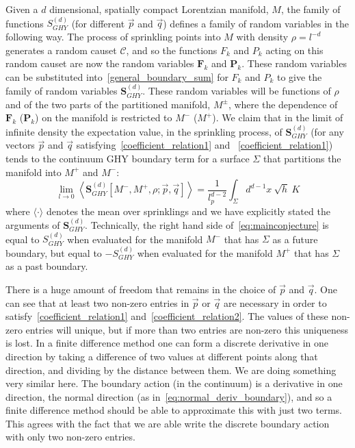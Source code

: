 \documentclass[12pt]{article}
\newcommand{\be}{\begin{equation}}
\newcommand{\ee}{\end{equation}}
\newcommand{\F}[1]{F_{#1}}
\renewcommand{\P}[1]{P_{#1}}
\newcommand{\BF}[1]{\mathbf{F}_{#1}}
\newcommand{\BP}[1]{\mathbf{P}_{#1}}
\begin{document}
Given a $d$ dimensional, spatially compact Lorentzian manifold, $M$, the family of functions $S^{ (d)}_{GHY}$ (for different $\vec{p}$ and $\vec{q}$) defines a family of random variables in the following way. The process of sprinkling points into $M$ with density $\rho=l^{-d}$ generates a random causet $\mathcal{C}$, and so the functions $\F{k}$ and $\P{k}$ acting on this random causet are now the random variables $\BF{k}$ and $\BP{k}$. These random variables can be substituted into~\eqref{general_boundary_sum} for $\F{k}$ and $\P{k}$ to give the family of random variables $\textbf{S}^{ (d)}_{GHY}$. These random variables will be functions of $\rho$ and of the two parts of the partitioned manifold, $M^{\pm}$, where the dependence of $\BF{k}$ ($\BP{k}$) on the manifold is restricted to $M^-$ ($M^+$). We claim that in the limit of infinite density the expectation value, in the sprinkling process, of $\textbf{S}^{ (d)}_{GHY}$ (for any vectors $\vec{p}$ and $\vec{q}$ satisfying~\eqref{coefficient_relation1} and ~\eqref{coefficient_relation1}) tends to the continuum GHY boundary term for a surface $\Sigma$ that partitions the manifold into $M^+$ and $M^-$:
\be
\lim_{l\rightarrow0}\left\langle\textbf{S}^{ (d)}_{GHY}[M^-,M^+,\rho;\vec{p} , \vec{q}]\right\rangle= \frac{1}{l_p^{d-2}}\int_{\Sigma} d^{d-1}x\: \sqrt{h}\: K\label{eq:mainconjecture}
\ee
where $\langle\cdot\rangle$ denotes the mean over sprinklings and we have explicitly stated the arguments of $\textbf{S}^{ (d)}_{GHY}$. Technically, the right hand side of~\eqref{eq:mainconjecture} is equal to ${S}^{(d)}_{GHY}$ when evaluated for the manifold $M^-$ that has $\Sigma$ as a future boundary, but equal to  $-{S}^{(d)}_{GHY}$ when evaluated for the manifold $M^+$ that has $\Sigma$ as a past boundary.

There is a huge amount of freedom that remains in the choice of $\vec{p}$ and $\vec{q}$. One can see that at least two non-zero entries in $\vec{p}$ or $\vec{q}$ are necessary in order to satisfy~\eqref{coefficient_relation1} and~\eqref{coefficient_relation2}. The values of these non-zero entries will unique, but if more than two entries are non-zero this uniqueness is lost. In a finite difference method one can form a discrete derivative in one direction by taking a difference of two values at different points along that direction, and dividing by the distance between them. We are doing something very similar here. The boundary action (in the continuum) is a derivative in one direction, the normal direction (as in~\eqref{eq:normal_deriv_boundary}), and so a finite difference method should be able to approximate this with just two terms. This agrees with the fact that we are able write the discrete boundary action with only two non-zero entries.
\end{document}
